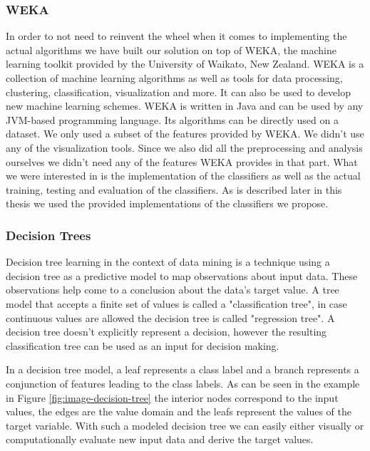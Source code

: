 \subsubsection{WEKA}
\label{subsection:WEKA}
In order to not need to reinvent the wheel when it comes to implementing the actual algorithms we have built our solution on top of WEKA, the machine learning toolkit provided by the University of Waikato, New Zealand. WEKA is a collection of machine learning algorithms as well as tools for data processing, clustering, classification, visualization and more. It can also be used to develop new machine learning schemes. WEKA is written in Java and can be used by any JVM-based programming language. Its algorithms can be directly used on a dataset. We only used a subset of the features provided by WEKA. We didn't use any of the visualization tools. Since we also did all the preprocessing and analysis ourselves we didn't need any of the features WEKA provides in that part. What we were interested in is the implementation of the classifiers as well as the actual training, testing and evaluation of the classifiers. As is described later in this thesis we used the provided implementations of the classifiers we propose. 

\subsubsection{Decision Trees}
Decision tree learning in the context of data mining is a technique using a decision tree as a predictive model to map observations about input data. These observations help come to a conclusion about the data's target value. A tree model that accepts a finite set of values is called a "classification tree", in case continuous values are allowed the decision tree is called "regression tree". A decision tree doesn't explicitly represent a decision, however the resulting classification tree can be used as an input for decision making. 

In a decision tree model, a leaf represents a class label and a branch represents a conjunction of features leading to the class labels. As can be seen in the example in Figure \ref{fig:image-decision-tree} the interior nodes correspond to the input values, the edges are the value domain and the leafs represent the values of the target variable. With such a modeled decision tree we can easily either visually or computationally evaluate new input data and derive the target values.

